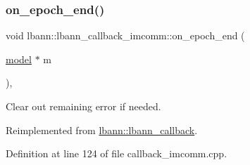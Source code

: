 \subsubsection{\texorpdfstring{on\+\_\+epoch\+\_\+end()}{on\_epoch\_end()}}
{\footnotesize\ttfamily void lbann\+::lbann\+\_\+callback\+\_\+imcomm\+::on\+\_\+epoch\+\_\+end (\begin{DoxyParamCaption}\item[{\hyperlink{classlbann_1_1model}{model} $\ast$}]{m }\end{DoxyParamCaption})\hspace{0.3cm}{\ttfamily [override]}, {\ttfamily [virtual]}}

Clear out remaining error if needed. 

Reimplemented from \hyperlink{classlbann_1_1lbann__callback_a1fc71110e7f754bf73c9e0f344a448a5}{lbann\+::lbann\+\_\+callback}.



Definition at line 124 of file callback\+\_\+imcomm.\+cpp.


